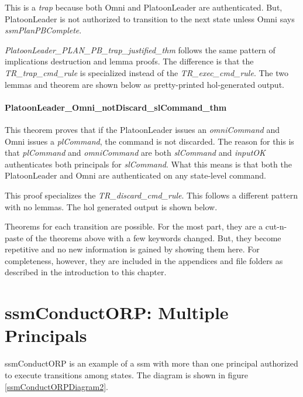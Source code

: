 \documentclass[../../main/main.tex]{subfiles}
\begin{document}
This is a \textit{trap} because both Omni and PlatoonLeader are authenticated.  But, PlatoonLeader is not authorized to transition to the next state unless Omni says \textit{ssmPlanPBComplete}.



\textit{PlatoonLeader_PLAN_PB_trap_justified_thm} follows the same pattern of implications destruction and lemma proofs.  The difference is that the \textit{TR_trap_cmd_rule} is specialized instead of the \textit{TR_exec_cmd_rule}.  The two lemmas and theorem are shown below as pretty-printed \gls{hol}-generated output.  

\HOLssmPBIntegratedTheoremsPlatoonLeaderXXPLANXXPBXXtrapXXlemma
{}\HOLssmPBIntegratedTheoremsPlatoonLeaderXXPLANXXPBXXtrapXXjustifiedXXlemma
\HOLssmPBIntegratedTheoremsPlatoonLeaderXXPLANXXPBXXtrapXXjustifiedXXthm

\paragraph*{PlatoonLeader_Omni_notDiscard_slCommand_thm}
This theorem proves that if the PlatoonLeader issues an \textit{omniCommand} and Omni issues a \textit{plCommand}, the command is not discarded.  The reason for this is that \textit{plCommand} and \textit{omniCommand} are both \textit{slCommand} and  \textit{inputOK} authenticates both principals for \textit{slCommand}.  What this means is that both the PlatoonLeader and Omni are authenticated on any state-level command.

This proof specializes the \textit{TR_discard_cmd_rule}.  This follows a different pattern with no lemmas.  The \gls{hol} generated output is shown below.

\HOLssmPBIntegratedTheoremsPlatoonLeaderXXOmniXXnotDiscardXXslCommandXXthm

Theorems for each transition are possible. For the most part, they are a cut-n-paste of the theorems above with a few keywords changed.  But, they become repetitive and no new information is gained by showing them here. For completeness, however, they are included in the appendices and file folders as described in the introduction to this chapter.
\section{ssmConductORP: Multiple Principals}
ssmConductORP is an example of a \gls{ssm} with more than one principal authorized to execute transitions among states. The diagram is shown in figure \ref{ssmConductORPDiagram2}.
\end{document}
